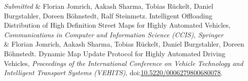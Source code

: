 \documentclass[11pt, a4paper]{article}
\newcommand{\DOI}[1]{doi:\href{https://doi.org/#1}{#1}}
\newcommand{\Year}[1]{\fontsize{10pt}{0}\selectfont #1}
\begin{document}
\begin{EntriesTable}
\Year{\textit{Submitted}}  &
    Florian Jomrich, Aakash Sharma, Tobias R{\"u}ckelt, Daniel Burgstahler, Doreen B{\"o}hnstedt, Ralf Steinmetz.
    Intelligent Offloading Distribution of High Definition Street Maps for Highly Automated Vehicles,
    \emph{Communications in Computer and Information Science (CCIS), Springer}
   \\
\Year{2017}  &
    Florian Jomrich, Aakash Sharma, Tobias R{\"u}ckelt, Daniel Burgstahler, Doreen B{\"o}hnstedt.
    Dynamic Map Update Protocol for Highly Automated Driving Vehicles,
    \emph{Proceedings of the International Conference on Vehicle Technology and Intelligent Transport Systems (VEHITS)},
    \DOI{10.5220/0006279800680078}.
    \\
\end{EntriesTable}

\iffalse
\end{document}
